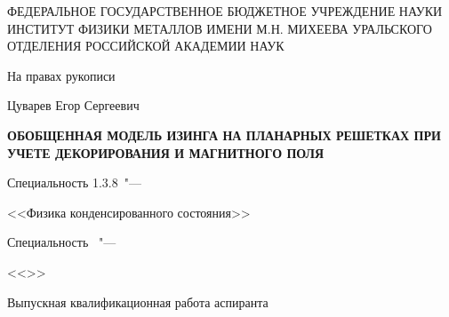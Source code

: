 \thispagestyle{empty}
\begin{center}
ФЕДЕРАЛЬНОЕ ГОСУДАРСТВЕННОЕ БЮДЖЕТНОЕ УЧРЕЖДЕНИЕ НАУКИ ИНСТИТУТ ФИЗИКИ МЕТАЛЛОВ ИМЕНИ М.Н. МИХЕЕВА УРАЛЬСКОГО ОТДЕЛЕНИЯ РОССИЙСКОЙ АКАДЕМИИ НАУК
\end{center}
%
\vspace{0pt plus4fill} %
{
\begin{flushright}
На правах рукописи

\end{flushright}
}
%
\vspace{0pt plus6fill} %
\begin{center}
{\large Цуварев Егор Сергеевич}
\end{center}
%
\vspace{0pt plus1fill} %
\begin{center}
\textbf {\large %
ОБОБЩЕННАЯ МОДЕЛЬ ИЗИНГА НА ПЛАНАРНЫХ РЕШЕТКАХ ПРИ УЧЕТЕ ДЕКОРИРОВАНИЯ И МАГНИТНОГО ПОЛЯ}

\vspace{0pt plus2fill} %
{%
Специальность 1.3.8\ "---

<<Физика конденсированного состояния>>
}

\ifdefined\thesisSpecialtyTwoNumber
{%
Специальность \thesisSpecialtyTwoNumber\ "---

<<\thesisSpecialtyTwoTitle>>
}
\fi

\vspace{0pt plus2fill} %
Выпускная квалификационная работа аспиранта
\end{center}
